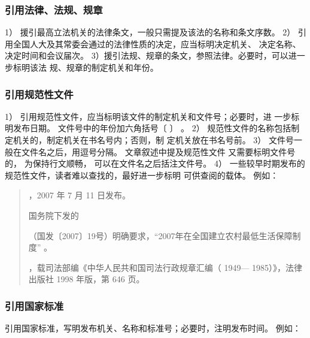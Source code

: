 \documentclass{article}
\begin{document}
\subsubsection{引用法律、法规、规章}
1） 援引最高立法机关的法律条文，一般只需提及该法的名称和条文序数。
2） 引用全国人大及其常委会通过的法律性质的决定，应当标明决定机关、
决定名称、决定时间和会议届次。
3）援引法规、规章的条文，参照法律。必要时，可以进一步标明该法
规、规章的制定机关和年份。


\subsubsection{引用规范性文件}

1） 引用规范性文件，应当标明该文件的制定机关和文件号；必要时，进
一步标明发布日期。 文件号中的年份加六角括号〔 〕 。 
2） 规范性文件的名称包括制定机关的，制定机关在书名号内；否则，制
定机关放在书名号前。
3） 文件号一般在文件名之后，用逗号分隔。 文章叙述中提及规范性文件
又需要标明文件号的， 为保持行文顺畅， 可以在文件名之后括注文件号。
4） 一些较早时期发布的规范性文件，读者难以查找的，最好进一步标明
可供查阅的载体。
例如：

\begin{quotation}

，2007 年 7 月 11 日发布。

国务院下发的

（国发〔2007〕19号）明确要求，“2007年在全国建立农村最低生活保障制度” 。


，载司法部编《中华人民共和国司法行政规章汇编（ 1949— 1985）》，法律出版社 1998 年版，第 646 页。
\end{quotation}


\subsubsection{引用国家标准}
引用国家标准，写明发布机关、名称和标准号；必要时，注明发布时间。
例如：

\begin{quotation}
\end{quotation}
\end{document}
